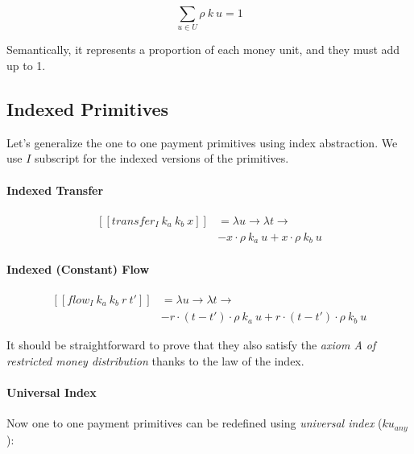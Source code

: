 \begin{equation}
    \displaystyle \sum_{u \in U} \rho\ k\ u = 1
\end{equation}

Semantically, it represents a proportion of each money unit, and they must add up to 1.

\subsection{Indexed Primitives}

Let's generalize the one to one payment primitives using index abstraction. We use $I$ subscript for
the indexed versions of the primitives.

\paragraph{Indexed Transfer}

\begin{equation}
    \begin{split}
        [\![transfer_I\ k_a\ k_b\ x]\!] &=
        \lambda u \rightarrow \lambda t \rightarrow \\
        &-x \cdot \rho\ k_a\ u + x \cdot \rho\ k_b\ u
    \end{split}
\end{equation}

\paragraph{Indexed (Constant) Flow}

\begin{equation}
    \begin{split}
        [\![flow_I\ k_a\ k_b\ r\ t']\!] &=
        \lambda u \rightarrow \lambda t \rightarrow \\
        &-r \cdot (t - t') \cdot \rho\ k_a\ u + r \cdot (t - t') \cdot \rho\ k_b\ u
    \end{split}
\end{equation}

It should be straightforward to prove that they also satisfy the \textit{axiom A of restricted money
distribution} thanks to the law of the index.

\paragraph{Universal Index}

Now one to one payment primitives can be redefined using \textit{universal index} ($ku_{any}$):

